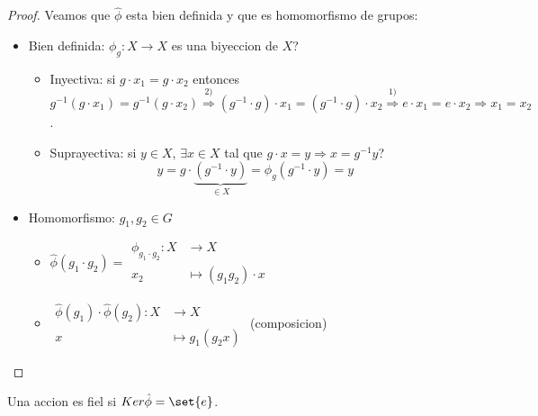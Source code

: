\begin{proof}
	Veamos que \(\hat{\phi}\) esta bien definida y que es homomorfismo de grupos:
	\begin{itemize}
		\item Bien definida: \(\phi_g \colon X \to X \) es una biyeccion de \(X \)?
		      \begin{itemize}
			      \item Inyectiva: si \(g \cdot x_1 = g \cdot x _2 \) entonces \(g^{-1} (g \cdot x_1) = g^{-1} (g \cdot x_2 ) \overset{2)}{\Rightarrow} (g^{-1} \cdot g) \cdot x_1 = (g^{-1} \cdot g) \cdot x_2 \overset{1)}{\Rightarrow} e \cdot x_1 = e \cdot x_2 \Rightarrow x_1 = x_2  \).
			      \item  Suprayectiva: si \(y \in X \), \(\exists x \in X \) tal que \(g \cdot x = y \Rightarrow x = g^{-1} y \)?
			            \[
				            y = g \cdot \underbrace{(g^{-1} \cdot y)}_{\in X} = \phi_g (g^{-1} \cdot y) = y
			            \]
		      \end{itemize}
		\item Homomorfismo: \(g_1, g_2 \in G \)
		      \begin{itemize}
			      \item \(\hat{\phi}(g_1 \cdot g_2) = \begin{aligned}
				            \phi_{g_1 \cdot g_2} \colon X & \to X                      \\
				            x_2                           & \mapsto (g_1 g_2)\cdot  x
			            \end{aligned}\)
			      \item \(\begin{aligned}
				            \hat{\phi}(g_1 )\cdot \hat{\phi}(g_2)  \colon X & \to X                \\
				            x                                               & \mapsto g_1 (g_2 x)
			            \end{aligned}\) (composicion)
		      \end{itemize}
	\end{itemize}
\end{proof}
\begin{definition}
	Una accion es fiel si \(Ker\hat{\phi} = \set{e}\).
\end{definition}
